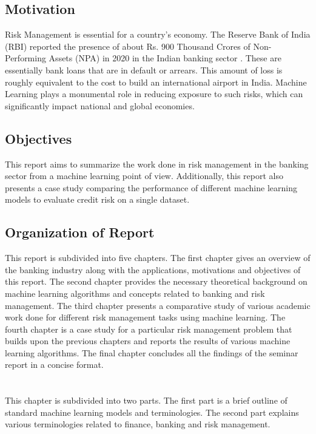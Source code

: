\documentclass[a4paper, 12pt]{article}
\begin{document}
\vskip 0.2in
\subsection{Motivation}
Risk Management is essential for a country's economy. The Reserve Bank of India (RBI) reported the presence of about Rs. 900 Thousand Crores of Non-Performing Assets (NPA) in 2020 in the Indian banking sector \cite{rbi20}. These are essentially bank loans that are in default or arrears. This amount of loss is roughly equivalent to the cost to build an international airport in India. Machine Learning plays a monumental role in reducing exposure to such risks, which can significantly impact national and global economies.
\vskip 0.2in
\subsection{Objectives}
This report aims to summarize the work done in risk management in the banking sector from a machine learning point of view. Additionally, this report also presents a case study comparing the performance of different machine learning models to evaluate credit risk on a single dataset.
\vskip 0.2in
\subsection{Organization of Report}
This report is subdivided into five chapters. The first chapter gives an overview of the banking industry along with the applications, motivations and objectives of this report. The second chapter provides the necessary theoretical background on machine learning algorithms and concepts related to banking and risk management. The third chapter presents a comparative study of various academic work done for different risk management tasks using machine learning. The fourth chapter is a case study for a particular risk management problem that builds upon the previous chapters and reports the results of various machine learning algorithms. The final chapter concludes all the findings of the seminar report in a concise format.
\newpage

\section{}
\vskip 0.25in
This chapter is subdivided into two parts. The first part is a brief outline of standard machine learning models and terminologies. The second part explains various terminologies related to finance, banking and risk management.
\vskip 0.2in
\end{document}
